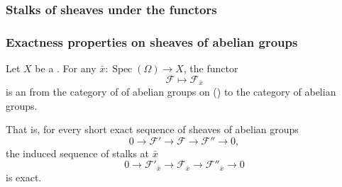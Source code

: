 \TODO{}

\subsubsection{Stalks of sheaves under the functors}















\subsubsection{Exactness properties on sheaves of abelian groups}


\begin{theorem}
Let $X$ be a . For any  $\bar{x} : \operatorname{Spec}(\Omega) \to X$, the  functor
$$ \mathcal{F} \mapsto \mathcal{F}_{\bar{x}} $$
is an  from the category of  of abelian groups on  () to the category of abelian groups. 

That is, for every short exact sequence of sheaves of abelian groups
$$ 0 \to \mathcal{F}' \to \mathcal{F} \to \mathcal{F}'' \to 0, $$
the induced sequence of stalks at $\bar{x}$
$$ 0 \to \mathcal{F}'_{\bar{x}} \to \mathcal{F}_{\bar{x}} \to \mathcal{F}''_{\bar{x}} \to 0 $$
is exact.
\end{theorem}

